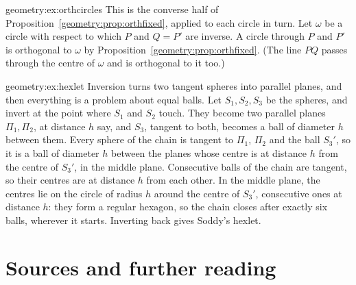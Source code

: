 \begin{solution}{geometry:ex:orthcircles}
\idea This is the converse half of Proposition~\ref{geometry:prop:orthfixed}, applied to each circle in turn.
\writeup Let $\omega$ be a circle with respect to which $P$ and $Q=P'$ are inverse. A circle through $P$ and $P'$ is orthogonal to $\omega$ by
Proposition~\ref{geometry:prop:orthfixed}. (The line $PQ$ passes through the centre of $\omega$ and is orthogonal to it too.)
\end{solution}

\begin{solution}{geometry:ex:hexlet}
\idea Inversion turns two tangent spheres into parallel planes, and then everything is a problem about equal balls.
\writeup Let $S_1,S_2,S_3$ be the spheres, and invert at the point where $S_1$ and $S_2$ touch. They become two parallel planes $\Pi_1,\Pi_2$, at
distance $h$ say, and $S_3$, tangent to both, becomes a ball of diameter $h$ between them. Every sphere of the chain is tangent to $\Pi_1$, $\Pi_2$
and the ball $S_3'$, so it is a ball of diameter $h$ between the planes whose centre is at distance $h$ from the centre of $S_3'$, in the middle
plane. Consecutive balls of the chain are tangent, so their centres are at distance $h$ from each other. In the middle plane, the centres lie on
the circle of radius $h$ around the centre of $S_3'$, consecutive ones at distance $h$: they form a regular hexagon, so the chain closes after
exactly six balls, wherever it starts. Inverting back gives Soddy's hexlet.
\end{solution}

\section*{Sources and further reading}

